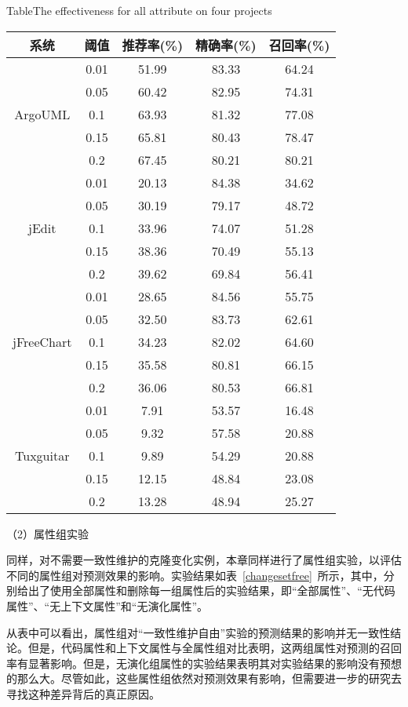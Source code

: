 \begin{table}[htbp]
{Table$\!$}{The effectiveness for all attribute on four projects}
\vspace{0.5em}
\centering
\wuhao
\begin{tabular}{ccccc}
\toprule[1.5pt]
{系统}&{阈值}&{推荐率(\%)}&{精确率(\%)}&{召回率(\%)}\\
\midrule[1pt]
\multirow{5}{*}{ArgoUML}
&0.01&	51.99&	83.33&	64.24\\
&0.05&	60.42&	82.95&	74.31\\
&0.1&	63.93&	81.32&	77.08\\
&0.15&	65.81&	80.43&	78.47\\
&0.2&	67.45&	80.21&	80.21\\
\hline
\multirow{5}{*}{jEdit}
&0.01&	20.13&	84.38&	34.62\\
&0.05&	30.19&	79.17&	48.72\\
&0.1&	33.96&	74.07&	51.28\\
&0.15&	38.36&	70.49&	55.13\\
&0.2&	39.62&	69.84&	56.41\\
\hline
\multirow{5}{*}{jFreeChart}
&0.01&	28.65&	84.56&	55.75\\
&0.05&	32.50&	83.73&	62.61\\
&0.1&	34.23&	82.02&	64.60\\
&0.15&	35.58&	80.81&	66.15\\
&0.2&	36.06&	80.53&	66.81\\
\hline
\multirow{5}{*}{Tuxguitar}
&0.01&	7.91&	53.57&	16.48\\
&0.05&	9.32&	57.58&	20.88\\
&0.1&	9.89&	54.29&	20.88\\
&0.15&	12.15&	48.84&	23.08\\
&0.2&	13.28&	48.94&	25.27\\
\bottomrule[1.5pt]
\end{tabular}
\end{table}

（2）属性组实验

同样，对不需要一致性维护的克隆变化实例，本章同样进行了属性组实验，以评估不同的属性组对预测效果的影响。实验结果如表~\ref{changesetfree}~所示，其中，分别给出了使用全部属性和删除每一组属性后的实验结果，即“全部属性”、“无代码属性”、“无上下文属性”和“无演化属性”。

从表中可以看出，属性组对“一致性维护自由”实验的预测结果的影响并无一致性结论。但是，代码属性和上下文属性与全属性组对比表明，这两组属性对预测的召回率有显著影响。但是，无演化组属性的实验结果表明其对实验结果的影响没有预想的那么大。尽管如此，这些属性组依然对预测效果有影响，但需要进一步的研究去寻找这种差异背后的真正原因。

